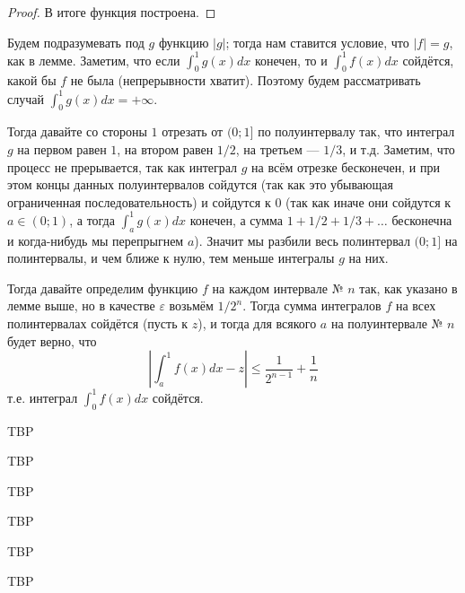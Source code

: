 \documentclass[12pt,a4paper]{article}
\begin{document}
\begin{enumproblem}
\begin{proof}
            В итоге функция построена.
        \end{proof}

        Будем подразумевать под $g$ функцию $|g|$; тогда нам ставится условие, что $|f| = g$, как в лемме. Заметим, что если $\int_0^1 g(x) dx$ конечен, то и $\int_0^1 f(x) dx$ сойдётся, какой бы $f$ не была (непрерывности хватит). Поэтому будем рассматривать случай $\int_0^1 g(x) dx = +\infty$.

        Тогда давайте со стороны $1$ отрезать от $(0; 1]$ по полуинтервалу так, что интеграл $g$ на первом равен $1$, на втором равен $1/2$, на третьем --- $1/3$, и т.д. Заметим, что процесс не прерывается, так как интеграл $g$ на всём отрезке бесконечен, и при этом концы данных полуинтервалов сойдутся (так как это убывающая ограниченная последовательность) и сойдутся к $0$ (так как иначе они сойдутся к $a \in (0; 1)$, а тогда $\int_a^1 g(x) dx$ конечен, а сумма $1 + 1/2 + 1/3 + \dots$ бесконечна и когда-нибудь мы перепрыгнем $a$). Значит мы разбили весь полинтервал $(0; 1]$ на полинтервалы, и чем ближе к нулю, тем меньше интегралы $g$ на них.
        
        Тогда давайте определим функцию $f$ на каждом интервале № $n$ так, как указано в лемме выше, но в качестве $\varepsilon$ возьмём $1/2^n$. Тогда сумма интегралов $f$ на всех полинтервалах сойдётся (пусть к $z$), и тогда для всякого $a$ на полуинтервале № $n$ будет верно, что
        \[\left|\int_a^1 f(x) dx - z\right| \leqslant \frac{1}{2^{n-1}} + \frac{1}{n}\]
        т.е. интеграл $\int_0^1 f(x) dx$ сойдётся.
    \end{enumproblem}

    \begin{enumproblem}
        TBP
    \end{enumproblem}

    \begin{enumproblem}
        TBP
    \end{enumproblem}

    \begin{enumproblem}
        TBP
    \end{enumproblem}

    \begin{enumproblem}
        TBP
    \end{enumproblem}

    \begin{enumproblem}
        TBP
    \end{enumproblem}

    \begin{enumproblem}
        TBP
    \end{enumproblem}
    
\end{document}
